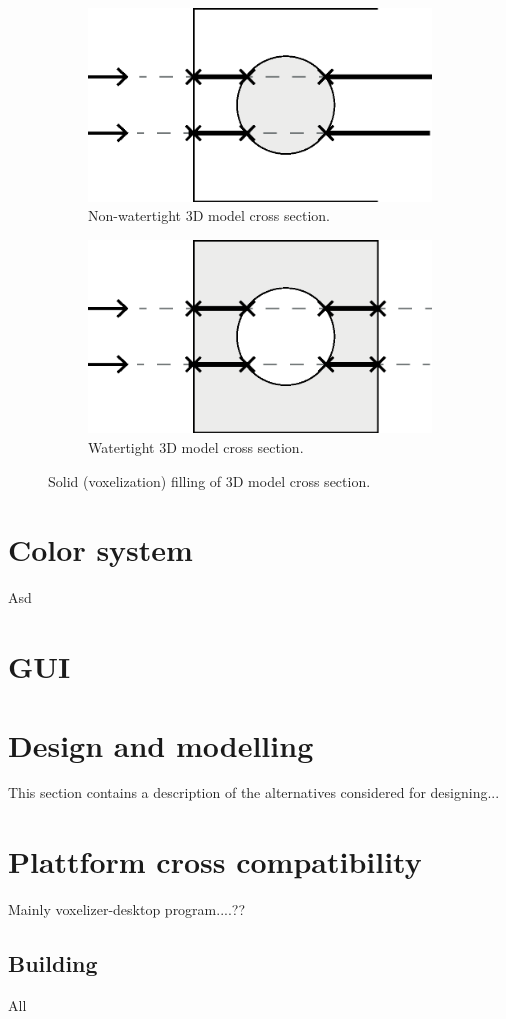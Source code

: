 \begin{figure}[h]
    \centering
    \begin{subfigure}[b]{0.45\textwidth}
        \centering
        \includegraphics[width=\textwidth]{sections/methodology/figures/solid-non-watertight}
        \caption{Non-watertight 3D model cross section.}
        \label{fig:filling-non-watertight-model}
    \end{subfigure}
    \hfill
    \begin{subfigure}[b]{0.45\textwidth}
        \centering
        \includegraphics[width=\textwidth]{sections/methodology/figures/solid-watertight}
        \caption{Watertight 3D model cross section.}
        \label{fig:filling-watertight-model}
    \end{subfigure}
       \caption{Solid (voxelization) filling of 3D model cross section.}
       \label{fig:filling-3d-model}
\end{figure}


\section{Color system}
Asd

\section{GUI}


\break
\section{Design and modelling}
This section contains a description of the alternatives considered for designing...


\section{Plattform cross compatibility}
Mainly voxelizer-desktop program....??

\subsection{Building}
All 
